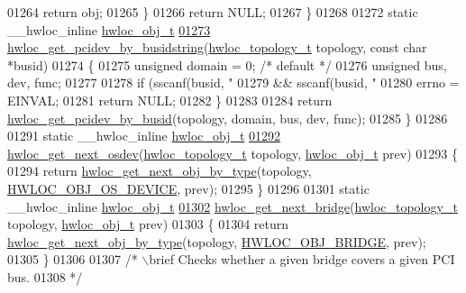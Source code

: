 \begin{DoxyCode}
01264       \textcolor{keywordflow}{return} obj;
01265   \}
01266   \textcolor{keywordflow}{return} NULL;
01267 \}
01268 
01272 \textcolor{keyword}{static} \_\_hwloc\_inline \hyperlink{a00016}{hwloc_obj_t}
\hypertarget{a00031_source_l01273}{}\hyperlink{a00064_ga9d5643f2e337fe1b98e7cce5c1ecb74e}{01273} \hyperlink{a00064_ga9d5643f2e337fe1b98e7cce5c1ecb74e}{hwloc_get_pcidev_by_busidstring}(\hyperlink{a00039_ga9d1e76ee15a7dee158b786c30b6a6e38}{hwloc_topology_t} topology, \textcolor{keyword}{const} \textcolor{keywordtype}{char} *busid)
01274 \{
01275   \textcolor{keywordtype}{unsigned} domain = 0; \textcolor{comment}{/* default */}
01276   \textcolor{keywordtype}{unsigned} bus, dev, func;
01277 
01278   \textcolor{keywordflow}{if} (sscanf(busid, \textcolor{stringliteral}{"%
01279       && sscanf(busid, \textcolor{stringliteral}{"%
01280     errno = EINVAL;
01281     \textcolor{keywordflow}{return} NULL;
01282   \}
01283 
01284   \textcolor{keywordflow}{return} \hyperlink{a00064_ga546e1d690c63fb24177f3013ed78ceb1}{hwloc_get_pcidev_by_busid}(topology, domain, bus, dev, func);
01285 \}
01286 
01291 \textcolor{keyword}{static} \_\_hwloc\_inline \hyperlink{a00016}{hwloc_obj_t}
\hypertarget{a00031_source_l01292}{}\hyperlink{a00064_ga73a5bc6265642e6001f7a10812ab886d}{01292} \hyperlink{a00064_ga73a5bc6265642e6001f7a10812ab886d}{hwloc_get_next_osdev}(\hyperlink{a00039_ga9d1e76ee15a7dee158b786c30b6a6e38}{hwloc_topology_t} topology, \hyperlink{a00016}{hwloc_obj_t} prev)
01293 \{
01294   \textcolor{keywordflow}{return} \hyperlink{a00053_ga5f08ceb69375341e73563cfe2e77534e}{hwloc_get_next_obj_by_type}(topology, \hyperlink{a00041_ggacd37bb612667dc437d66bfb175a8dc55a51e7280240fd9f25589cbbe538bdb075}{HWLOC_OBJ_OS_DEVICE}, prev);
01295 \}
01296 
01301 \textcolor{keyword}{static} \_\_hwloc\_inline \hyperlink{a00016}{hwloc_obj_t}
\hypertarget{a00031_source_l01302}{}\hyperlink{a00064_ga2bd3f856d0fc3c6c02642c17d763b823}{01302} \hyperlink{a00064_ga2bd3f856d0fc3c6c02642c17d763b823}{hwloc_get_next_bridge}(\hyperlink{a00039_ga9d1e76ee15a7dee158b786c30b6a6e38}{hwloc_topology_t} topology, \hyperlink{a00016}{hwloc_obj_t} prev)
01303 \{
01304   \textcolor{keywordflow}{return} \hyperlink{a00053_ga5f08ceb69375341e73563cfe2e77534e}{hwloc_get_next_obj_by_type}(topology, \hyperlink{a00041_ggacd37bb612667dc437d66bfb175a8dc55a6825f10895fea60aca7a6ba9fe273db0}{HWLOC_OBJ_BRIDGE}, prev);
01305 \}
01306 
01307 \textcolor{comment}{/* \(\backslash\)brief Checks whether a given bridge covers a given PCI bus.}
01308 \textcolor{comment}{ */}
}}
\end{DoxyCode}
